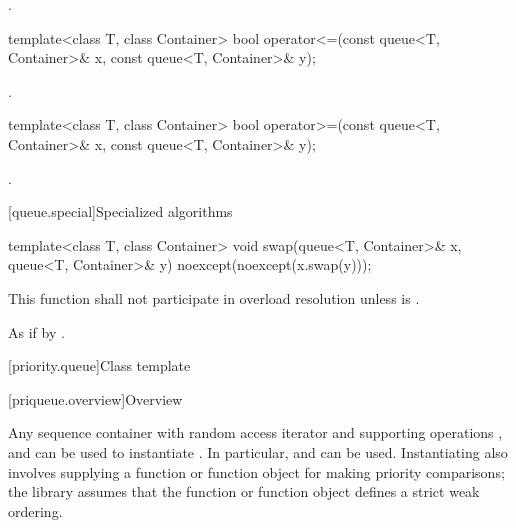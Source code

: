 \begin{itemdescr}
\pnum
\returns
{}.
\end{itemdescr}

%
\begin{itemdecl}
template<class T, class Container>
  bool operator<=(const queue<T, Container>& x, const queue<T, Container>& y);
\end{itemdecl}

\begin{itemdescr}
\pnum
\returns
{}.
\end{itemdescr}

%
\begin{itemdecl}
template<class T, class Container>
    bool operator>=(const queue<T, Container>& x,
                    const queue<T, Container>& y);
\end{itemdecl}

\begin{itemdescr}
\pnum
\returns
{}.
\end{itemdescr}

[queue.special]{Specialized algorithms}

%
\begin{itemdecl}
template<class T, class Container>
  void swap(queue<T, Container>& x, queue<T, Container>& y) noexcept(noexcept(x.swap(y)));
\end{itemdecl}

\begin{itemdescr}
\pnum
\remarks
This function shall not participate in overload resolution
unless  is .

\pnum
\effects As if by .
\end{itemdescr}

[priority.queue]{Class template }

[priqueue.overview]{Overview}

\pnum
{}%
Any sequence container with random access iterator and supporting operations
,
and
can be used to instantiate
.
In particular,
and
can be used.
Instantiating
also involves supplying a function or function object for making
priority comparisons; the library assumes that the function or function
object defines a strict weak ordering.

